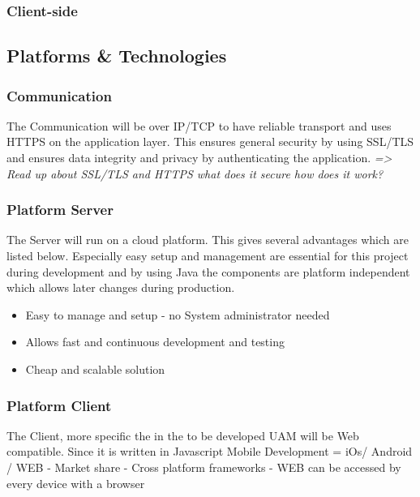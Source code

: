 \documentclass[a4paper,11pt]{article}
\begin{document}
\subsubsection{Client-side}





\subsection{Platforms \& Technologies}

\subsubsection{Communication}
The Communication will be over IP/TCP to have reliable transport and uses HTTPS on the application layer. This ensures general security by using SSL/TLS and ensures data integrity and privacy by authenticating the application.
\textit{=> Read up about SSL/TLS and HTTPS what does it secure how does it work?}

\subsubsection{Platform Server}
The Server will run on a cloud platform. This gives several advantages which are listed below. Especially easy setup and management are essential for this project during development and by using Java the components are platform independent which allows later changes during production.
\begin{itemize}
\item Easy to manage and setup - no System administrator needed
\item Allows fast and continuous development and testing
\item Cheap and scalable solution
\end{itemize}

\subsubsection{Platform Client}
The Client, more specific the in the to be developed UAM will be Web compatible. Since it is written in Javascript
Mobile Development = iOs/ Android / WEB
	- Market share
	- Cross platform frameworks 
	- WEB can be accessed by every device with a browser
	
\end{document}
